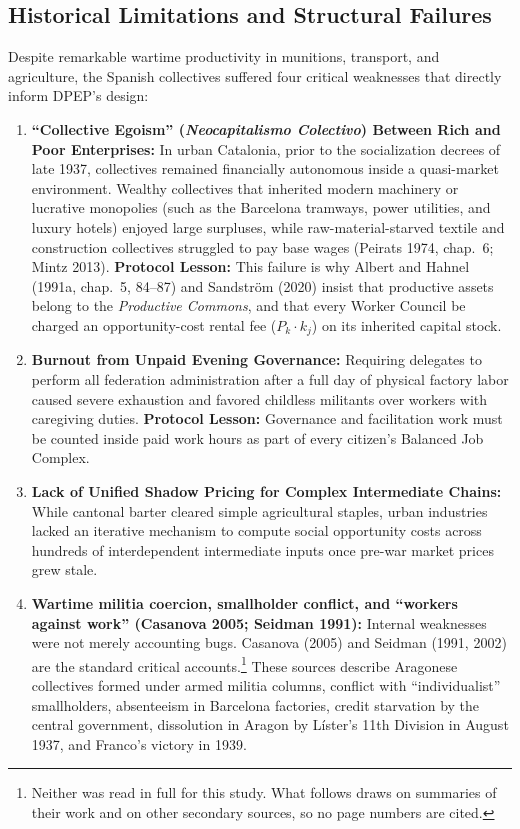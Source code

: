 \documentclass[10pt,twoside,openany]{book}
\theoremstyle{dpepstyle}
\begin{document}
\subsection{Historical Limitations and Structural Failures}
Despite remarkable wartime productivity in munitions, transport, and agriculture, the Spanish collectives suffered four critical weaknesses that directly inform DPEP's design:
\begin{enumerate}[leftmargin=1.8em,itemsep=2pt]
  \item \textbf{``Collective Egoism'' (\emph{Neocapitalismo Colectivo}) Between Rich and Poor Enterprises:} In urban Catalonia, prior to the socialization decrees of late 1937, collectives remained financially autonomous inside a quasi-market environment. Wealthy collectives that inherited modern machinery or lucrative monopolies (such as the Barcelona tramways, power utilities, and luxury hotels) enjoyed large surpluses, while raw-material-starved textile and construction collectives struggled to pay base wages (Peirats 1974, chap.~6; Mintz 2013). \textbf{Protocol Lesson:} This failure is why Albert and Hahnel (1991a, chap.~5, 84--87) and Sandstr\"om (2020) insist that productive assets belong to the \emph{Productive Commons}, and that every Worker Council be charged an opportunity-cost rental fee ($P_k \cdot k_j$) on its inherited capital stock.
  \item \textbf{Burnout from Unpaid Evening Governance:} Requiring delegates to perform all federation administration after a full day of physical factory labor caused severe exhaustion and favored childless militants over workers with caregiving duties. \textbf{Protocol Lesson:} Governance and facilitation work must be counted inside paid work hours as part of every citizen's Balanced Job Complex.
  \item \textbf{Lack of Unified Shadow Pricing for Complex Intermediate Chains:} While cantonal barter cleared simple agricultural staples, urban industries lacked an iterative mechanism to compute social opportunity costs across hundreds of interdependent intermediate inputs once pre-war market prices grew stale.
  \item \textbf{Wartime militia coercion, smallholder conflict, and ``workers against work'' (Casanova 2005; Seidman 1991):} Internal weaknesses were not merely accounting bugs. Casanova (2005) and Seidman (1991, 2002) are the standard critical accounts.\footnote{Neither was read in full for this study. What follows draws on summaries of their work and on other secondary sources, so no page numbers are cited.} These sources describe Aragonese collectives formed under armed militia columns, conflict with ``individualist'' smallholders, absenteeism in Barcelona factories, credit starvation by the central government, dissolution in Aragon by L\'ister's 11th Division in August 1937, and Franco's victory in 1939.
\end{enumerate}
\end{document}
